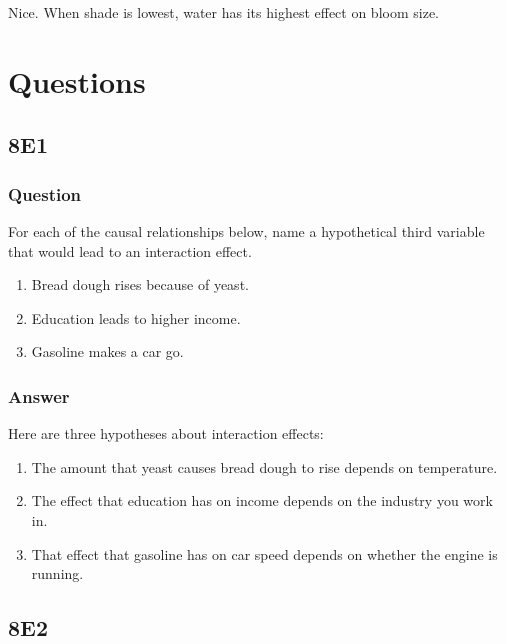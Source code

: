 \documentclass[
]{book}
\begin{document}
Nice. When shade is lowest, water has its highest effect on bloom size.

\hypertarget{questions-7}{%
\section{Questions}\label{questions-7}}

\hypertarget{e1-6}{%
\subsection*{8E1}\label{e1-6}}

\hypertarget{question-75}{%
\subsubsection*{Question}\label{question-75}}

For each of the causal relationships below, name a hypothetical third variable that would lead to an interaction effect.

\begin{enumerate}
\def\labelenumi{\arabic{enumi}.}
\item
  Bread dough rises because of yeast.
\item
  Education leads to higher income.
\item
  Gasoline makes a car go.
\end{enumerate}

\hypertarget{answer-75}{%
\subsubsection*{Answer}\label{answer-75}}

Here are three hypotheses about interaction effects:

\begin{enumerate}
\def\labelenumi{\arabic{enumi}.}
\item
  The amount that yeast causes bread dough to rise depends on temperature.
\item
  The effect that education has on income depends on the industry you work in.
\item
  That effect that gasoline has on car speed depends on whether the engine is running.
\end{enumerate}

\hypertarget{e2-5}{%
\subsection*{8E2}\label{e2-5}}
\end{document}
